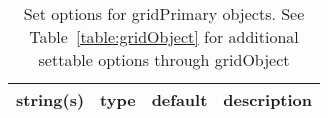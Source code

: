\begin{table}[ht]
\centering
\begin{tabular}{p{5cm} c c p{7cm}}
\hline
string(s) & type & default & description \\
\hline
\hline
\end{tabular}
\caption{Set options for gridPrimary objects. See Table~\ref{table:gridObject} for additional settable options through gridObject}
\label{table:gridPrimary}
\end{table}
